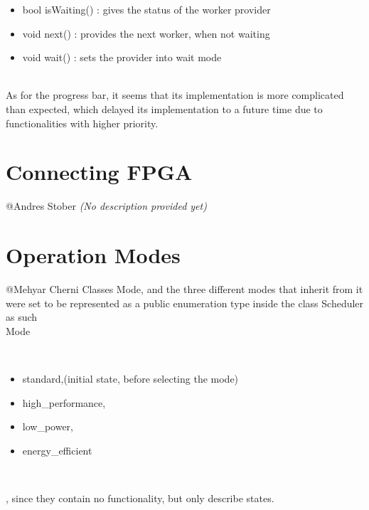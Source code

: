 \documentclass[parskip=full]{scrartcl}
\newcommand\tab[1][1cm]{\hspace*{#1}}
\begin{document}
	\begin {itemize}
		\item bool isWaiting() : gives the status of the worker provider
		\item void next() : provides the next worker, when not waiting
		\item void wait() : sets the provider into wait mode
	\end{itemize}
\\As for the progress bar, it seems that its implementation is more complicated than expected, which delayed its implementation to a future time due to functionalities with higher priority.
	
	
\pagebreak

\section{Connecting FPGA} \label{Connecting FPGA}
	@Andres Stober \textit{(No description provided yet)}
	

\pagebreak



\pagebreak

\section{Operation Modes} \label{Operation Modes}
	@Mehyar Cherni
	\tab Classes Mode, and the three different modes that inherit from it were set to be represented as a public enumeration type inside the class Scheduler as such \\ Mode { \\
	\begin {itemize}
		\item standard,(initial state, before selecting the mode)
		\item high_performance, 
		\item low_power,
		\item energy_efficient
	\end{itemize}  \\
	} , since they contain no functionality, but only describe states.


\pagebreak
\end{document}
